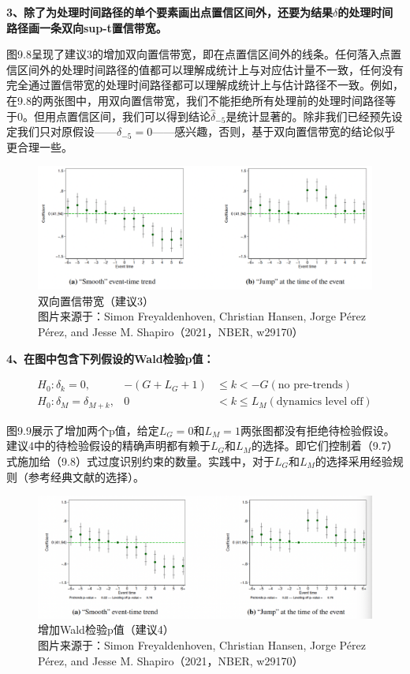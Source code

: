 \documentclass[cn,12pt,math=newtx,citestyle=gb7714-2015,bibstyle=gb7714-2015]{elegantbook}
\begin{document}
	
	\textbf{3、除了为处理时间路径的单个要素画出点置信区间外，还要为结果$\delta$的处理时间路径画一条双向sup-t置信带宽。}
	
	图9.8呈现了建议3的增加双向置信带宽，即在点置信区间外的线条。任何落入点置信区间外的处理时间路径的值都可以理解成统计上与对应估计量不一致，任何没有完全通过置信带宽的处理时间路径都可以理解成统计上与估计路径不一致。例如，在9.8的两张图中，用双向置信带宽，我们不能拒绝所有处理前的处理时间路径等于0。但用点置信区间，我们可以得到结论$\hat{\delta}_{-5}$是统计显著的。除非我们已经预先设定我们只对原假设——$\delta_{-5}=0$——感兴趣，否则，基于双向置信带宽的结论似乎更合理一些。
	
	\begin{figure}[tbph]
		\centering
		\includegraphics[width=1\linewidth]{sug3}
		\caption{双向置信带宽（建议3）\\ 图片来源于：Simon Freyaldenhoven, Christian Hansen, Jorge Pérez Pérez, and Jesse M. Shapiro（2021，NBER, w29170）}
		\label{fig:sug3}
	\end{figure}
	
		\textbf{4、在图中包含下列假设的Wald检验p值：}
		
		$$
		\begin{array}{lrl}
			H_{0}: \delta_{k}=0, & -\left(G+L_{G}+1\right) & \leq k<-G (\text{no pre-trends})\\
			H_{0}: \delta_{M}=\delta_{M+k}, & 0 & <k \leq L_{M}  (\text{dynamics level off})
		\end{array}
		$$
		
		图9.9展示了增加两个p值，给定$L_G=0$和$L_M=1$两张图都没有拒绝待检验假设。建议4中的待检验假设的精确声明都有赖于$L_G$和$L_M$的选择。即它们控制着（9.7）式施加给（9.8）式过度识别约束的数量。实践中，对于$L_G$和$L_M$的选择采用经验规则（参考经典文献的选择）。
	
	\begin{figure}[tbph]
		\centering
		\includegraphics[width=1\linewidth]{sug4}
		\caption{增加Wald检验p值（建议4）\\ 图片来源于：Simon Freyaldenhoven, Christian Hansen, Jorge Pérez Pérez, and Jesse M. Shapiro（2021，NBER, w29170）}
		\label{fig:sug4}
	\end{figure}
\end{document}
